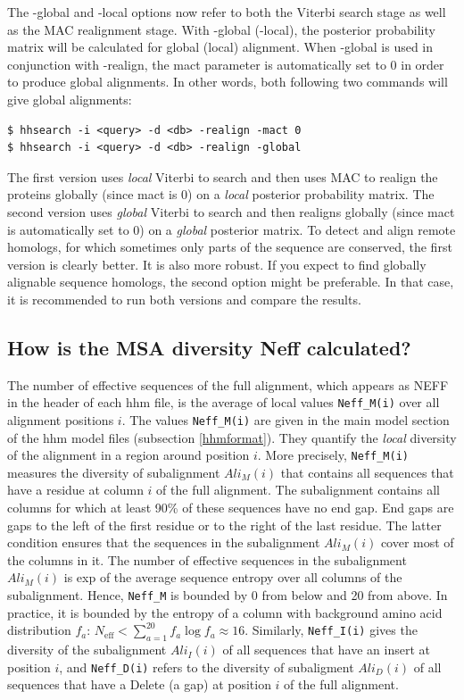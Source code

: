 \documentclass[11pt,a4paper]{article}
\begin{document}
The -global and -local options now refer to both the Viterbi search stage as 
well as the MAC realignment stage. With -global (-local), the posterior probability 
matrix will be calculated for global (local) alignment. When -global is used in 
conjunction with -realign, the mact parameter is automatically set to 0 in order to 
produce global alignments. In other words, both following two commands will give 
global alignments:
\begin{verbatim}
$ hhsearch -i <query> -d <db> -realign -mact 0
$ hhsearch -i <query> -d <db> -realign -global
\end{verbatim}

The first version uses \emph{local} Viterbi to search and then uses MAC to realign the 
proteins globally (since mact is 0) on a \emph{local} posterior probability matrix. The 
second version uses \emph{global} Viterbi to search and then realigns globally (since mact 
is automatically set to 0) on a \emph{global} posterior matrix. To detect and align remote 
homologs, for which sometimes only parts of the sequence are conserved, the first 
version is clearly better. It is also more robust. If you expect to find globally 
alignable sequence homologs, the second option might be preferable. In that case, 
it is recommended to run both versions and compare the results. 

\subsection{How is the MSA diversity Neff calculated?} \label{Neff}
The number of effective sequences of the full alignment, which appears as NEFF in the header of each hhm file, is the average of local values \verb`Neff_M(i)` over all alignment positions $i$. The values \verb`Neff_M(i)` are given in the main model section of the hhm model files (subsection \ref{hhmformat}). They quantify the \emph{local} diversity of the alignment in a region around position $i$. More precisely, \verb`Neff_M(i)` measures the diversity of subalignment $Ali_M(i)$ that contains all sequences that have a residue at column $i$ of the full alignment. The subalignment contains all columns for which at least 90\% of these sequences have no end gap. End gaps are gaps to the left of the first residue or to the right of the last residue. The latter condition ensures that the sequences in the subalignment $Ali_M(i)$ cover most of the columns in it. The number of effective sequences in the subalignment $Ali_M(i)$ is exp of the average sequence entropy over all columns of the subalignment. Hence, \verb`Neff_M` is bounded by 0 from below and 20 from above. In practice, it is bounded by the entropy of a column with background amino acid distribution $f_a$: $N_\mathrm{eff} < \sum_{a=1}^{20} f_a \log f_a \approx 16$. Similarly, \verb`Neff_I(i)` gives the diversity of the subalignment $Ali_I(i)$ of all sequences that have an insert at position $i$, and \verb`Neff_D(i)` refers to the diversity of subaligment $Ali_D(i)$ of all sequences that have a Delete (a gap) at position $i$ of the full alignment. 
\end{document}
